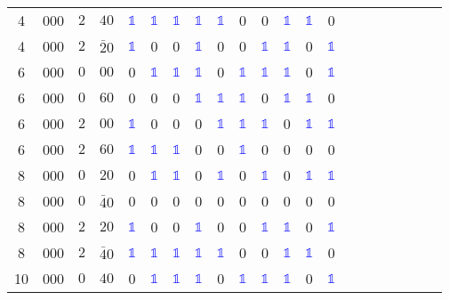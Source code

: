 \begin{longtable*}{c| cccccccccccccccccccc }
 4& 000& $2$& $40$& \textcolor{blue}{$\mathds{1}$}& \textcolor{blue}{$\mathds{1}$}& \textcolor{blue}{$\mathds{1}$}& \textcolor{blue}{$\mathds{1}$}& \textcolor{blue}{$\mathds{1}$}& 0& 0& \textcolor{blue}{$\mathds{1}$}& \textcolor{blue}{$\mathds{1}$}& 0\\
 4& 000& $2$& $\bar{2}0$& \textcolor{blue}{$\mathds{1}$}& 0& 0& \textcolor{blue}{$\mathds{1}$}& 0& 0& \textcolor{blue}{$\mathds{1}$}& \textcolor{blue}{$\mathds{1}$}& 0& \textcolor{blue}{$\mathds{1}$}\\
 6& 000& $0$& $00$& 0& \textcolor{blue}{$\mathds{1}$}& \textcolor{blue}{$\mathds{1}$}& \textcolor{blue}{$\mathds{1}$}& 0& \textcolor{blue}{$\mathds{1}$}& \textcolor{blue}{$\mathds{1}$}& \textcolor{blue}{$\mathds{1}$}& 0& \textcolor{blue}{$\mathds{1}$}\\
 6& 000& $0$& $60$& 0& 0& 0& \textcolor{blue}{$\mathds{1}$}& \textcolor{blue}{$\mathds{1}$}& \textcolor{blue}{$\mathds{1}$}& 0& \textcolor{blue}{$\mathds{1}$}& \textcolor{blue}{$\mathds{1}$}& 0\\
 6& 000& $2$& $00$& \textcolor{blue}{$\mathds{1}$}& 0& 0& 0& \textcolor{blue}{$\mathds{1}$}& \textcolor{blue}{$\mathds{1}$}& \textcolor{blue}{$\mathds{1}$}& 0& \textcolor{blue}{$\mathds{1}$}& \textcolor{blue}{$\mathds{1}$}\\
 6& 000& $2$& $60$& \textcolor{blue}{$\mathds{1}$}& \textcolor{blue}{$\mathds{1}$}& \textcolor{blue}{$\mathds{1}$}& 0& 0& \textcolor{blue}{$\mathds{1}$}& 0& 0& 0& 0\\
 8& 000& $0$& $20$& 0& \textcolor{blue}{$\mathds{1}$}& \textcolor{blue}{$\mathds{1}$}& 0& \textcolor{blue}{$\mathds{1}$}& 0& \textcolor{blue}{$\mathds{1}$}& 0& \textcolor{blue}{$\mathds{1}$}& \textcolor{blue}{$\mathds{1}$}\\
 8& 000& $0$& $\bar{4}0$& 0& 0& 0& 0& 0& 0& 0& 0& 0& 0\\
 8& 000& $2$& $20$& \textcolor{blue}{$\mathds{1}$}& 0& 0& \textcolor{blue}{$\mathds{1}$}& 0& 0& \textcolor{blue}{$\mathds{1}$}& \textcolor{blue}{$\mathds{1}$}& 0& \textcolor{blue}{$\mathds{1}$}\\
 8& 000& $2$& $\bar{4}0$& \textcolor{blue}{$\mathds{1}$}& \textcolor{blue}{$\mathds{1}$}& \textcolor{blue}{$\mathds{1}$}& \textcolor{blue}{$\mathds{1}$}& \textcolor{blue}{$\mathds{1}$}& 0& 0& \textcolor{blue}{$\mathds{1}$}& \textcolor{blue}{$\mathds{1}$}& 0\\
10& 000& $0$& $40$& 0& \textcolor{blue}{$\mathds{1}$}& \textcolor{blue}{$\mathds{1}$}& \textcolor{blue}{$\mathds{1}$}& 0& \textcolor{blue}{$\mathds{1}$}& \textcolor{blue}{$\mathds{1}$}& \textcolor{blue}{$\mathds{1}$}& 0& \textcolor{blue}{$\mathds{1}$}\\

\end{longtable*}
